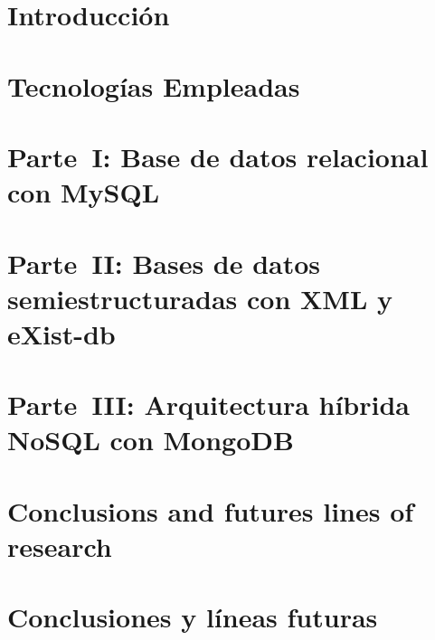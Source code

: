 \documentclass[12pt, a4paper, twoside]{article}
\begin{document}


\clearpage
\setcounter{page}{1}



\newpage



\newpage



\tableofcontents

\listoffigures

\listoftables

\lstlistoflistings

\section{Introducción}


\section{Tecnologías Empleadas}


\section{Parte~I: Base de datos relacional con MySQL}


\section{Parte~II: Bases de datos semiestructuradas con XML y eXist-db}


\section{Parte~III: Arquitectura híbrida NoSQL con MongoDB}


\section{Conclusions and futures lines of research}


\section{Conclusiones y líneas futuras}


\printbibliography

\newpage



\end{document}
